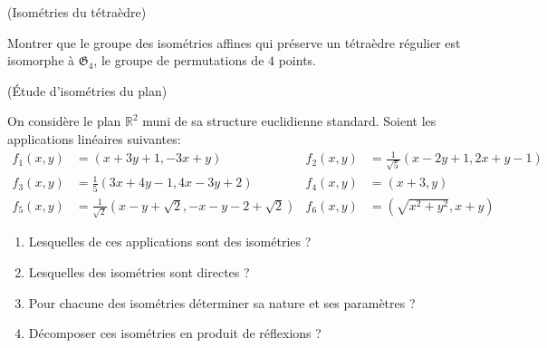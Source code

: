 \documentclass[a4paper,12pt,reqno]{amsart}
\begin{document}
\begin{exo} (Isométries du tétraèdre)

    Montrer que le groupe des isométries affines qui préserve un tétraèdre régulier est isomorphe à $\mathfrak{G}_{4}$, le groupe de permutations de $4$ points.
\end{exo}

\begin{exo} (Étude d'isométries du plan)

  On considère le plan $\mathbb{R}^{2}$ muni de sa structure euclidienne standard. Soient les applications linéaires suivantes:
  \begin{align*}
  f_{1}(x,y) &= (x+3y+1,-3x+y) & f_{2}(x,y) &= \frac{1}{\sqrt{5}}(x-2y+1,2x+y-1)\\
  f_{3}(x,y) &= \frac{1}{5}(3x+4y-1,4x-3y+2) & f_{4}(x,y) &= (x+3,y)\\
  f_{5}(x,y) &= \frac{1}{\sqrt{2}}(x-y+\sqrt{2},-x-y-2+\sqrt{2}) & f_{6}(x,y) &= (\sqrt{x^{2}+y^{2}},x+y)
  \end{align*}
  \begin{enumerate}
    \item Lesquelles de ces applications sont des isométries ?
    \item Lesquelles des isométries sont directes ?
    \item Pour chacune des isométries déterminer sa nature et ses paramètres ?
    \item Décomposer ces isométries en produit de réflexions ?
  \end{enumerate}
\end{exo}
\end{document}

